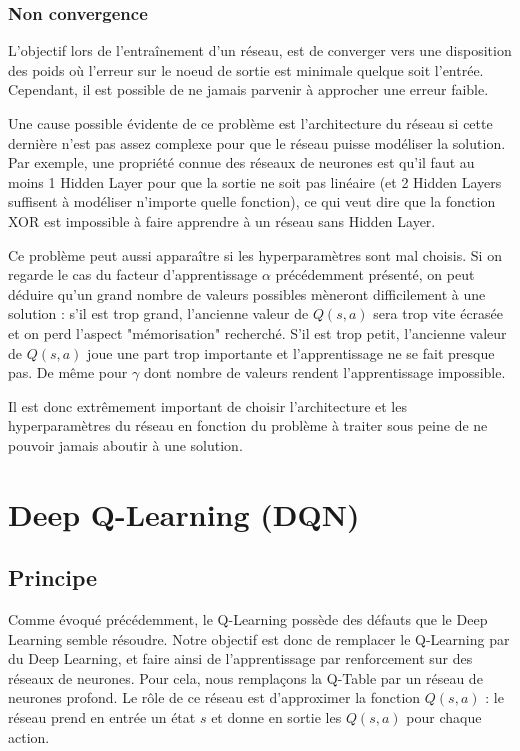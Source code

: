 \subsubsection{Non convergence}
L'objectif lors de l'entraînement d'un réseau, est de converger vers une disposition des poids où l'erreur sur le noeud de sortie est minimale quelque soit l'entrée. Cependant, il est possible de ne jamais parvenir à approcher une erreur faible.
\par
Une cause possible évidente de ce problème est l'architecture du réseau si cette dernière n'est pas assez complexe pour que le réseau puisse modéliser la solution. Par exemple, une propriété connue des réseaux de neurones est qu'il faut au moins 1 Hidden Layer pour que la sortie ne soit pas linéaire (et 2 Hidden Layers suffisent à modéliser n'importe quelle fonction), ce qui veut dire que la fonction XOR est impossible à faire apprendre à un réseau sans Hidden Layer.
\par
Ce problème peut aussi apparaître si les hyperparamètres sont mal choisis. Si on regarde le cas du facteur d'apprentissage $\alpha$ précédemment présenté, on peut déduire qu'un grand nombre de valeurs possibles mèneront difficilement à une solution : s'il est trop grand, l'ancienne valeur de $Q(s,a)$ sera trop vite écrasée et on perd l'aspect "mémorisation" recherché. S'il est trop petit, l'ancienne valeur de $Q(s,a)$ joue une part trop importante et l'apprentissage ne se fait presque pas. De même pour $\gamma$ dont nombre de valeurs rendent l'apprentissage impossible.
\par
Il est donc extrêmement important de choisir l'architecture et les hyperparamètres du réseau en fonction du problème à traiter sous peine de ne pouvoir jamais aboutir à une solution.


\section{Deep Q-Learning (DQN)}
\subsection{Principe}
Comme évoqué précédemment, le Q-Learning possède des défauts que le Deep Learning semble résoudre. Notre objectif est donc de remplacer le Q-Learning par du Deep Learning, et faire ainsi de l'apprentissage par renforcement sur des réseaux de neurones.
Pour cela, nous remplaçons la Q-Table par un réseau de neurones profond. Le rôle de ce réseau est d'approximer la fonction $Q(s,a)$ : le réseau prend en entrée un état $s$ et donne en sortie les $Q(s,a)$ pour chaque action.

